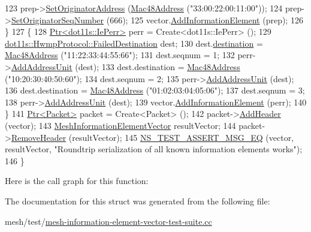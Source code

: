 \begin{DoxyCode}
123     prep->\hyperlink{classns3_1_1dot11s_1_1IePrep_a86179a652f5a26382b2a64325d162931}{SetOriginatorAddress} (\hyperlink{classns3_1_1Mac48Address}{Mac48Address} (\textcolor{stringliteral}{"33:00:22:00:11:00"}));
124     prep->\hyperlink{classns3_1_1dot11s_1_1IePrep_ad3c8051b8507fecfedc4b1880a8fb558}{SetOriginatorSeqNumber} (666);
125     vector.\hyperlink{classns3_1_1WifiInformationElementVector_aa28c3ec3babb8fd9622c424b5e0beb3f}{AddInformationElement} (prep);
126   \}
127   \{
128     \hyperlink{classns3_1_1Ptr}{Ptr<dot11s::IePerr>} perr = Create<dot11s::IePerr> ();
129     \hyperlink{structns3_1_1dot11s_1_1HwmpProtocol_1_1FailedDestination}{dot11s::HwmpProtocol::FailedDestination} dest;
130     dest.\hyperlink{structns3_1_1dot11s_1_1HwmpProtocol_1_1FailedDestination_a066b5f8457c2cac97e71978481a7fb35}{destination} = \hyperlink{classns3_1_1Mac48Address}{Mac48Address} (\textcolor{stringliteral}{"11:22:33:44:55:66"});
131     dest.seqnum = 1;
132     perr->\hyperlink{classns3_1_1dot11s_1_1IePerr_aa9c2baf90c75cf736d4b7b66cba3dd76}{AddAddressUnit} (dest);
133     dest.destination = \hyperlink{classns3_1_1Mac48Address}{Mac48Address} (\textcolor{stringliteral}{"10:20:30:40:50:60"});
134     dest.seqnum = 2;
135     perr->\hyperlink{classns3_1_1dot11s_1_1IePerr_aa9c2baf90c75cf736d4b7b66cba3dd76}{AddAddressUnit} (dest);
136     dest.destination = \hyperlink{classns3_1_1Mac48Address}{Mac48Address} (\textcolor{stringliteral}{"01:02:03:04:05:06"});
137     dest.seqnum = 3;
138     perr->\hyperlink{classns3_1_1dot11s_1_1IePerr_aa9c2baf90c75cf736d4b7b66cba3dd76}{AddAddressUnit} (dest);
139     vector.\hyperlink{classns3_1_1WifiInformationElementVector_aa28c3ec3babb8fd9622c424b5e0beb3f}{AddInformationElement} (perr);
140   \}
141   \hyperlink{classns3_1_1Ptr}{Ptr<Packet>} packet = Create<Packet> ();
142   packet->\hyperlink{classns3_1_1Packet_a465108c595a0bc592095cbcab1832ed8}{AddHeader} (vector);
143   \hyperlink{classns3_1_1MeshInformationElementVector}{MeshInformationElementVector} resultVector;
144   packet->\hyperlink{classns3_1_1Packet_a0961eccf975d75f902d40956c93ba63e}{RemoveHeader} (resultVector);
145   \hyperlink{group__testing_ga2a9d78cffb3db8e867c35fff0b698cf5}{NS\_TEST\_ASSERT\_MSG\_EQ} (vector, resultVector, \textcolor{stringliteral}{"Roundtrip serialization of all known
       information elements works"});
146 \}
\end{DoxyCode}


Here is the call graph for this function\+:




The documentation for this struct was generated from the following file\+:\begin{DoxyCompactItemize}
\item 
mesh/test/\hyperlink{mesh-information-element-vector-test-suite_8cc}{mesh-\/information-\/element-\/vector-\/test-\/suite.\+cc}\end{DoxyCompactItemize}
